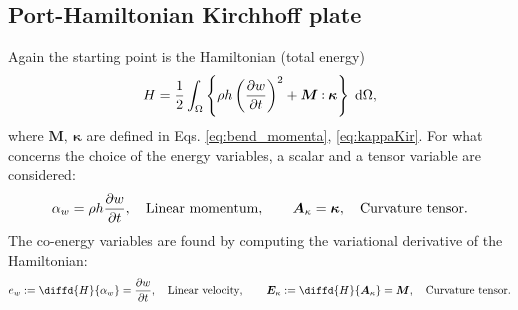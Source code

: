 \subsection{Port-Hamiltonian Kirchhoff plate}\label{sec:pHkirchh}
Again the starting point is the Hamiltonian (total energy)
\begin{equation}
\label{eq:Hkir}
H = \frac{1}{2} \int_{\Omega} \left\{\rho h \left(\diffp{w}{t} \right)^2 + \bm{M} \cddot \bm{\kappa}  \right\}  \d{\Omega} ,
\end{equation}
where $\bm{M}, \ \bm{\kappa}$ are defined in Eqs. \eqref{eq:bend_momenta}, \eqref{eq:kappaKir}. For what concerns the choice of the energy variables, a scalar and a tensor variable are considered:
\begin{equation}\label{eq:alpha_Kirchh}
\alpha_w = \rho h \diffp{w}{t}, \quad \text{Linear momentum}, \qquad \bm{A}_{\kappa} = \bm{\kappa}, \quad \text{Curvature tensor}.	\end{equation}
The co-energy variables are found by computing the variational derivative of the Hamiltonian:
\begin{equation}\label{eq:e_Kirchh}
e_w := \diffd{H}{\alpha_w} = \diffp{w}{t}, \quad \text{Linear velocity},  \qquad  \bm{E}_{\kappa} := \diffd{H}{\bm{A}_{\kappa}} = \bm{M}, \quad \text{Curvature tensor}.
\end{equation}

